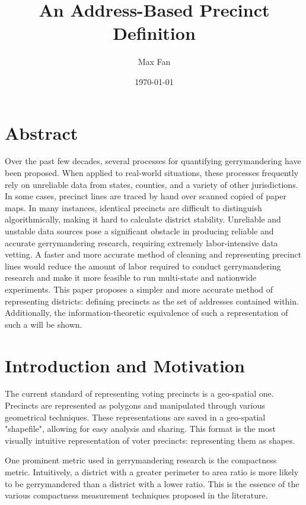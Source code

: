 \documentclass[11pt]{article}
\author{Max Fan}
\date{\today}
\title{An Address-Based Precinct Definition}
\begin{document}
\maketitle
\tableofcontents

\newpage

\section{Abstract}
\label{sec:orgac1a3ef}
Over the past few decades, several processes for quantifying gerrymandering have been proposed. 
When applied to real-world situations, these processes frequently rely on unreliable data from states, counties, and a variety of other jurisdictions. 
In some cases, precinct lines are traced by hand over scanned copied of paper maps. 
In many instances, identical precincts are difficult to distinguish algorithmically, making it hard to calculate district stability. 
Unreliable and unstable data sources pose a significant obstacle in producing reliable and accurate gerrymandering research, requiring extremely labor-intensive data vetting. 
A faster and more accurate method of cleaning and representing precinct lines would reduce the amount of labor required to conduct gerrymandering research and make it more feasible to run multi-state and nationwide experiments.
This paper proposes a simpler and more accurate method of representing districts: defining precincts as the set of addresses contained within.
Additionally, the information-theoretic equivalence of such a representation of such a will be shown.

\section{Introduction and Motivation}
\label{sec:org70369e8}
The current standard of representing voting precincts is a geo-spatial one.
Precincts are represented as polygons and manipulated through various geometrical techniques.
These representations are saved in a geo-spatial "shapefile", allowing for easy analysis and sharing.
This format is the most visually intuitive representation of voter precincts: representing them as shapes.

One prominent metric used in gerrymandering research is the compactness metric.
Intuitively, a district with a greater perimeter to area ratio is more likely to be gerrymandered than a district with a lower ratio.
This is the essence of the various compactness measurement techniques proposed in the literature.
\end{document}
